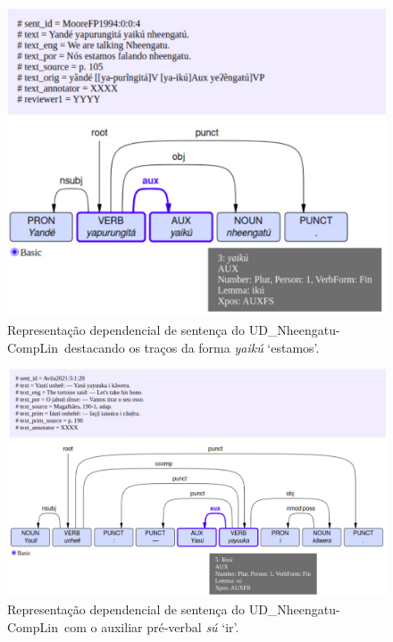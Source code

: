 \documentclass[portuguese]{textolivre}
\newcommand{\wt}[2]{\textit{#1} `#2'}
\newcommand{\tbc}{UD\_Nheengatu-CompLin}
\begin{document}
\begin{figure}[htbp]
  \centering
  \begin{minipage}{.7\textwidth}
    \includegraphics[width=\linewidth]{figures/moore-4.pdf}
    \caption{Representação dependencial de sentença do \tbc~destacando os traços da forma \textit{yaikú} `estamos'.}
    \label{fig:dep-tree}
  \end{minipage}
\end{figure}

\begin{figure}[htbp]
  \centering
  \begin{minipage}{.7\textwidth}
    \includegraphics[width=\linewidth]{figures/aux-su.pdf}
    \caption{Representação dependencial de sentença do \tbc~com o auxiliar pré-verbal \wt{sú}{ir}.}
    \label{fig:aux-su}
  \end{minipage}
\end{figure}
\end{document}
